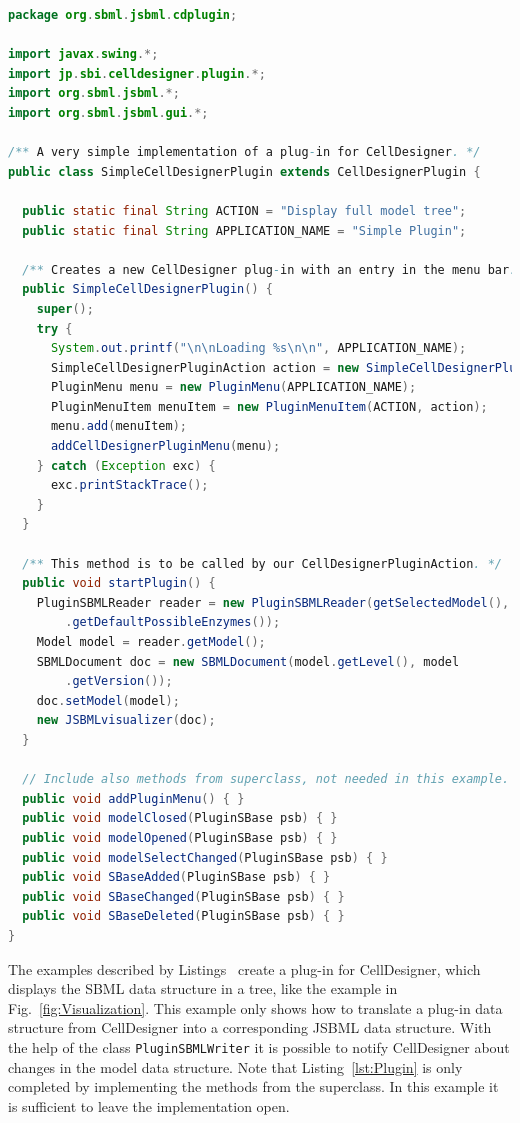 \documentclass[
  BCOR12mm,
  letterpaper,
  11pt,
  headsepline,
  pointlessnumbers,
  tablecaptionabove,
  onelinecaption,
  headinclude,
  appendixprefix,
  idxtotoc,
  bibtotoc,
  twoside,
  titlepage
]{scrartcl}
\begin{document}
\begin{lstlisting}[language=Java,float,caption={A simple example for a
CellDesigner plug-in using JSBML as a communication layer},label=lst:Plugin]
package org.sbml.jsbml.cdplugin;

import javax.swing.*;
import jp.sbi.celldesigner.plugin.*;
import org.sbml.jsbml.*;
import org.sbml.jsbml.gui.*;

/** A very simple implementation of a plug-in for CellDesigner. */
public class SimpleCellDesignerPlugin extends CellDesignerPlugin {

  public static final String ACTION = "Display full model tree";
  public static final String APPLICATION_NAME = "Simple Plugin";

  /** Creates a new CellDesigner plug-in with an entry in the menu bar. */
  public SimpleCellDesignerPlugin() {
    super();
    try {
      System.out.printf("\n\nLoading %s\n\n", APPLICATION_NAME);
      SimpleCellDesignerPluginAction action = new SimpleCellDesignerPluginAction(this);
      PluginMenu menu = new PluginMenu(APPLICATION_NAME);
      PluginMenuItem menuItem = new PluginMenuItem(ACTION, action);
      menu.add(menuItem);
      addCellDesignerPluginMenu(menu);
    } catch (Exception exc) {
      exc.printStackTrace();
    }
  }

  /** This method is to be called by our CellDesignerPluginAction. */
  public void startPlugin() {
    PluginSBMLReader reader = new PluginSBMLReader(getSelectedModel(), SBO
        .getDefaultPossibleEnzymes());
    Model model = reader.getModel();
    SBMLDocument doc = new SBMLDocument(model.getLevel(), model
        .getVersion());
    doc.setModel(model);
    new JSBMLvisualizer(doc);
  }

  // Include also methods from superclass, not needed in this example.
  public void addPluginMenu() { }
  public void modelClosed(PluginSBase psb) { }
  public void modelOpened(PluginSBase psb) { }
  public void modelSelectChanged(PluginSBase psb) { }
  public void SBaseAdded(PluginSBase psb) { }
  public void SBaseChanged(PluginSBase psb) { }
  public void SBaseDeleted(PluginSBase psb) { }
}
\end{lstlisting}
The examples described by Listings~
create a plug-in for CellDesigner, which displays the SBML data structure
in a tree, like the example in Fig.~\vref{fig:Visualization}. This example only
shows how to translate a plug-in data structure
from CellDesigner into a corresponding JSBML data structure. With the help of
the class \texttt{PluginSBMLWriter} it is possible to notify CellDesigner about
changes in the model data structure. Note that Listing~\vref{lst:Plugin} is only
completed by implementing the methods from the superclass. In this example it
is sufficient to leave the implementation open.

% 

\clearpage



\printindex
\end{document}
